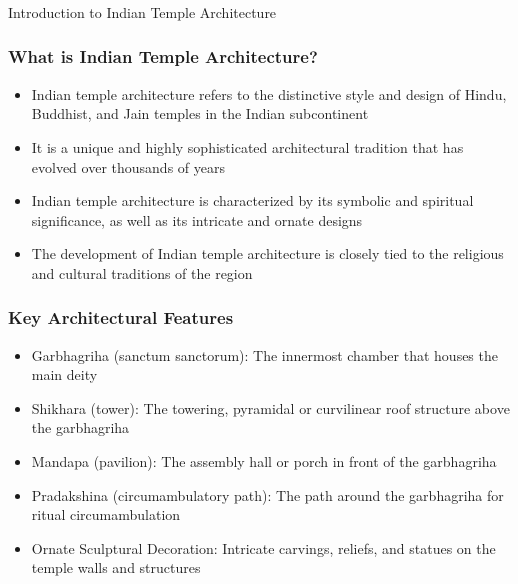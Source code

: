 \begin{frame}[fragile]\frametitle{}
\begin{center}
{\Large Introduction to Indian Temple Architecture}
\end{center}
\end{frame}

\begin{frame}[fragile]\frametitle{What is Indian Temple Architecture?}
    \begin{itemize}
        \item Indian temple architecture refers to the distinctive style and design of Hindu, Buddhist, and Jain temples in the Indian subcontinent
        \item It is a unique and highly sophisticated architectural tradition that has evolved over thousands of years
        \item Indian temple architecture is characterized by its symbolic and spiritual significance, as well as its intricate and ornate designs
        \item The development of Indian temple architecture is closely tied to the religious and cultural traditions of the region
    \end{itemize}
\end{frame}

\begin{frame}[fragile]\frametitle{Key Architectural Features}
    \begin{itemize}
        \item Garbhagriha (sanctum sanctorum): The innermost chamber that houses the main deity
        \item Shikhara (tower): The towering, pyramidal or curvilinear roof structure above the garbhagriha
        \item Mandapa (pavilion): The assembly hall or porch in front of the garbhagriha
        \item Pradakshina (circumambulatory path): The path around the garbhagriha for ritual circumambulation
        \item Ornate Sculptural Decoration: Intricate carvings, reliefs, and statues on the temple walls and structures
    \end{itemize}
\end{frame}

